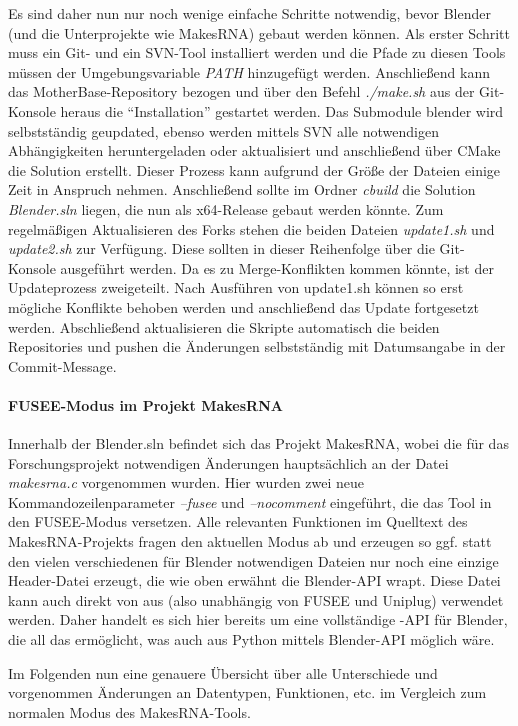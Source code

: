 Es sind daher nun nur noch wenige einfache Schritte notwendig, bevor Blender (und die Unterprojekte wie MakesRNA) gebaut werden können. Als erster Schritt muss ein Git- und ein SVN-Tool installiert werden und die Pfade zu diesen Tools müssen der Umgebungsvariable \emph{PATH} hinzugefügt werden. Anschließend kann das MotherBase-Repository bezogen und über den Befehl \emph{./make.sh} aus der Git-Konsole heraus die \enquote{Installation} gestartet werden. Das Submodule blender wird selbstständig geupdated, ebenso werden mittels SVN alle notwendigen Abhängigkeiten heruntergeladen oder aktualisiert und anschließend über CMake die Solution erstellt. Dieser Prozess kann aufgrund der Größe der Dateien einige Zeit in Anspruch nehmen. Anschließend sollte im Ordner \emph{cbuild} die Solution \emph{Blender.sln} liegen, die nun als x64-Release gebaut werden könnte. Zum regelmäßigen Aktualisieren des Forks stehen die beiden Dateien \emph{update1.sh} und \emph{update2.sh} zur Verfügung. Diese sollten in dieser Reihenfolge über die Git-Konsole ausgeführt werden. Da es zu Merge-Konflikten kommen könnte, ist der Updateprozess zweigeteilt. Nach Ausführen von update1.sh können so erst mögliche Konflikte behoben werden und anschließend das Update fortgesetzt werden. Abschließend aktualisieren die Skripte automatisch die beiden Repositories und pushen die Änderungen selbstständig mit Datumsangabe in der Commit-Message.

\paragraph{FUSEE-Modus im Projekt MakesRNA}

Innerhalb der Blender.sln befindet sich das Projekt MakesRNA, wobei die für das Forschungsprojekt notwendigen Änderungen hauptsächlich an der Datei \emph{makesrna.c} vorgenommen wurden. Hier wurden zwei neue Kommandozeilenparameter \emph{--fusee} und \emph{--nocomment} eingeführt, die das Tool in den FUSEE-Modus versetzen. Alle relevanten Funktionen im Quelltext des MakesRNA-Projekts fragen den aktuellen Modus ab und erzeugen so ggf. statt den vielen verschiedenen für Blender notwendigen Dateien nur noch eine einzige Header-Datei erzeugt, die wie oben erwähnt die Blender-API wrapt. Diese Datei kann auch direkt von \CC{} aus (also unabhängig von FUSEE und Uniplug) verwendet werden. Daher handelt es sich hier bereits um eine vollständige \CC-API für Blender, die all das ermöglicht, was auch aus Python mittels Blender-API möglich wäre.

Im Folgenden nun eine genauere Übersicht über alle Unterschiede und vorgenommen Änderungen an Datentypen, Funktionen, etc. im Vergleich zum normalen Modus des MakesRNA-Tools.


